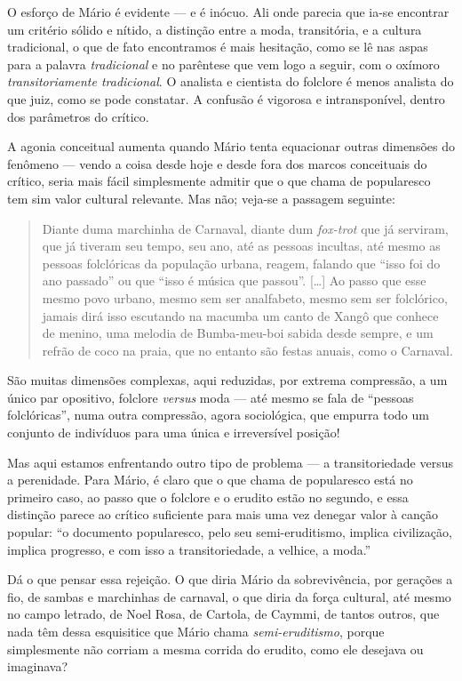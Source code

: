 O esforço de Mário é evidente --- e é inócuo. Ali onde parecia que ia-se
encontrar um critério sólido e nítido, a distinção entre a moda,
transitória, e a cultura tradicional, o que de fato encontramos é mais
hesitação, como se lê nas aspas para a palavra \textit{tradicional} e no
parêntese que vem logo a seguir, com o oxímoro \textit{transitoriamente
tradicional}. O analista e cientista do folclore é menos analista do
que juiz, como se pode constatar. A confusão é vigorosa e
intransponível, dentro dos parâmetros do crítico.

A agonia conceitual aumenta quando Mário tenta equacionar outras
dimensões do fenômeno --- vendo a coisa desde hoje e desde fora dos
marcos conceituais do crítico, seria mais fácil simplesmente admitir que
o que chama de popularesco tem sim valor cultural relevante. Mas não;
veja-se a passagem seguinte:

\begin{quote}
Diante duma marchinha de Carnaval, diante dum \textit{fox-trot} que já
serviram, que já tiveram seu tempo, seu ano, até as pessoas incultas, até
mesmo as pessoas folclóricas da população urbana, reagem, falando que
``isso foi do ano passado'' ou que ``isso é música que passou''. {[}\ldots{}{]}
Ao passo que esse mesmo povo urbano, mesmo sem ser analfabeto, mesmo sem
ser folclórico, jamais dirá isso escutando na macumba um canto de Xangô
que conhece de menino, uma melodia de Bumba-meu-boi sabida desde sempre,
e um refrão de coco na praia, que no entanto são festas anuais, como o
Carnaval.
\end{quote}

São muitas dimensões complexas, aqui reduzidas, por extrema compressão,
a um único par opositivo, folclore \textit{versus} moda --- até mesmo se fala de
``pessoas folclóricas'', numa outra compressão, agora sociológica, que
empurra todo um conjunto de indivíduos para uma única e irreversível
posição!

Mas aqui estamos enfrentando outro tipo de problema --- a transitoriedade
versus a perenidade. Para Mário, é claro que o que chama de popularesco
está no primeiro caso, ao passo que o folclore e o erudito estão no
segundo, e essa distinção parece ao crítico suficiente para mais uma vez
denegar valor à canção popular: ``o documento popularesco, pelo seu
semi-eruditismo, implica civilização, implica progresso, e com isso a
transitoriedade, a velhice, a moda.''

Dá o que pensar essa rejeição. O que diria Mário da sobrevivência, por
gerações a fio, de sambas e marchinhas de carnaval, o que diria da força
cultural, até mesmo no campo letrado, de Noel Rosa, de Cartola, de
Caymmi, de tantos outros, que nada têm dessa esquisitice que Mário chama
\textit{semi-eruditismo}, porque simplesmente não corriam a mesma corrida do
erudito, como ele desejava ou imaginava?

